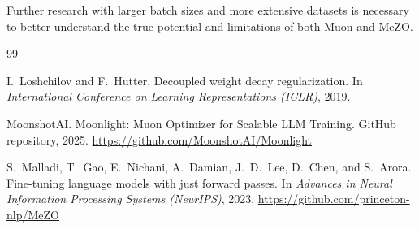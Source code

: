 \documentclass{article}
\begin{document}
Further research with larger batch sizes and more extensive datasets is necessary to better understand the true potential and limitations of both Muon and MeZO.



\begin{thebibliography}{99}

I.~Loshchilov and F.~Hutter.
\newblock Decoupled weight decay regularization.
\newblock In \textit{International Conference on Learning Representations (ICLR)}, 2019.

MoonshotAI.
\newblock Moonlight: Muon Optimizer for Scalable LLM Training.
\newblock GitHub repository, 2025.
\newblock \url{https://github.com/MoonshotAI/Moonlight}

S.~Malladi, T.~Gao, E.~Nichani, A.~Damian, J.~D.~Lee, D.~Chen, and S.~Arora.
\newblock Fine-tuning language models with just forward passes.
\newblock In \textit{Advances in Neural Information Processing Systems (NeurIPS)}, 2023.
\newblock \url{https://github.com/princeton-nlp/MeZO}

\end{thebibliography}
\end{document}
